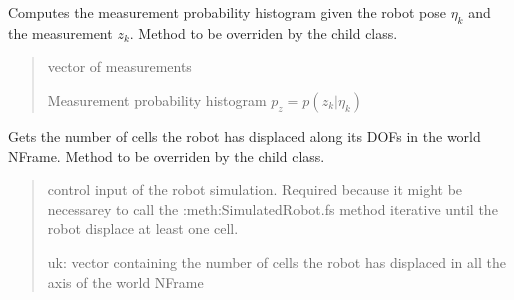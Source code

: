 \documentclass[letterpaper,10pt,english]{sphinxmanual}
\begin{document}
\begin{fulllineitems}

\begin{fulllineitems}
\label{\detokenize{GridLocalization:GL.GL.MeasurementProbability}}
\pysigstartsignatures
{}
\pysigstopsignatures
\sphinxAtStartPar
Computes the measurement probability histogram given the robot pose \(\eta_k\) and the measurement \(z_k\).
Method to be overriden by the child class.
\begin{quote}\begin{description}
\sphinxAtStartPar
{} \textendash{} vector of measurements

\sphinxAtStartPar
Measurement probability histogram \(p_z=p(z_k | \eta_k)\)

\end{description}\end{quote}

\end{fulllineitems}


\begin{fulllineitems}
\label{\detokenize{GridLocalization:GL.GL.GetInput}}
\pysigstartsignatures
{}
\pysigstopsignatures
\sphinxAtStartPar
Gets the number of cells the robot has displaced along its DOFs in the world N\sphinxhyphen{}Frame.
Method to be overriden by the child class.
\begin{quote}\begin{description}
\sphinxAtStartPar
{} \textendash{} control input of the robot simulation. Required because it might be necessarey to call the :meth:SimulatedRobot.fs\textasciigrave{} method iterative until the robot displace at least one cell.

\sphinxAtStartPar
uk: vector containing the number of cells the robot has displaced in all the axis of the world N\sphinxhyphen{}Frame

\end{description}\end{quote}


\end{fulllineitems}
\end{fulllineitems}
\end{document}

